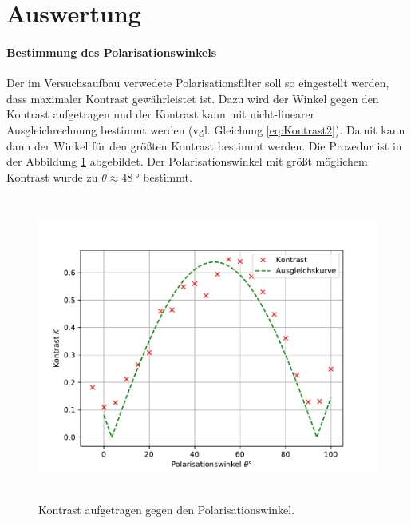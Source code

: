 \section{Auswertung}
\label{sec:Auswertung}
\paragraph{Bestimmung des Polarisationswinkels}
Der im Versuchsaufbau verwedete Polarisationsfilter soll so eingestellt werden, dass maximaler Kontrast 
gewährleistet ist. Dazu wird der Winkel gegen den Kontrast aufgetragen und der Kontrast kann mit nicht-linearer 
Ausgleichrechnung bestimmt werden (vgl. Gleichung \eqref{eq:Kontrast2}). 
Damit kann dann der Winkel für den größten Kontrast bestimmt werden. Die 
Prozedur ist in der Abbildung \ref{fig:K} abgebildet. Der Polarisationswinkel mit größt möglichem Kontrast 
wurde zu $\theta \approx \SI{48}{\degree}$ bestimmt.
\begin{figure}
  \centering
  \includegraphics[height = 10cm]{plots/Kontrastfit.pdf}
  \caption{Kontrast aufgetragen gegen den Polarisationswinkel.}
  \label{fig:K}
\end{figure}
\FloatBarrier
